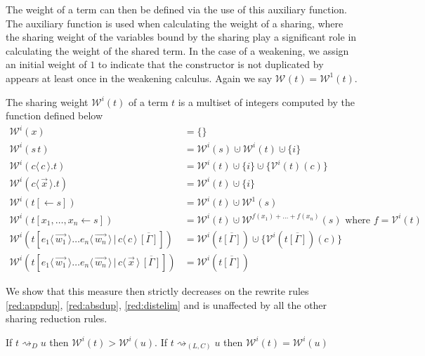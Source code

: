 \documentclass[a4paper,UKenglish,cleveref, autoref]{lipics-v2019}
\newcommand{\set}[1]{ \{ #1 \} }
\newcommand{\app}[2]{#1 \, #2}
\newcommand{\fake}[3]{#1 \langle \, #2 \, \rangle . #3}
\newcommand{\share}[3]{#1 [#2 \leftarrow #3]}
\newcommand{\dist}[5]{#1 [ #2 \, \vert \, \fakedist{#4}{#5} \, #3 ]}
\newcommand{\fakedist}[2]{#1 \langle \, #2 \, \rangle}
\newcommand{\weight}[2]{\mathcal{W}^{#1}(#2)}
\newcommand{\weightvar}[2]{\mathcal{V}^{#1}(#2)}
\begin{document}
\noindent The weight of a term can then be defined via the use of this auxiliary function. The auxiliary function is used when calculating the weight of a sharing, where the sharing weight of the variables bound by the sharing play a significant role in calculating the weight of the shared term. In the case of a weakening, we assign an initial weight of $1$ to indicate that the constructor is not duplicated by appears at least once in the weakening calculus. Again we say $\weight{}{t} = \weight{1}{t}$.

\begin{definition}
The sharing weight $\weight{i}{t}$ of a term $t$ is a multiset of integers computed by the function defined below
\begin{align*}
	\weight{i}{x} &= \set{} \\
	\weight{i}{\app{s}{t}} &= \weight{i}{s} \cupdot \weight{i}{t} \cupdot \set{i}\\
	\weight{i}{\fake{c}{c}{t}} &= \weight{i}{t} \cupdot \set{i} \cupdot \set{\weightvar{i}{t}(c)} \\
	\weight{i}{\fake{c}{\vec{x}}{t}} &= \weight{i}{t} \cupdot \set{i} \\
	\weight{i}{\share{t}{}{s}} &= \weight{i}{t} \cupdot \weight{1}{s} \\
	\weight{i}{\share{t}{x_{1}, \dots, x_{n}}{s}} &= \weight{i}{t} \cupdot \weight{f(x_{1}) + \dots + f(x_{n})}{s} \text{ where } f = \weightvar{i}{t} \\
	\weight{i}{\dist{t}{\fakedist{e_{1}}{\vec{w_{1}}} \dots \fakedist{e_{n}}{\vec{w_{n}}}}{\overline{[\Gamma]}}{c}{c}} &= \weight{i}{t\overline{[\Gamma]}} \cupdot \set{\weightvar{i}{t\overline{[\Gamma]}} (c)} \\ %
	\weight{i}{\dist{t}{\fakedist{e_{1}}{\vec{w_{1}}} \dots \fakedist{e_{n}}{\vec{w_{n}}}}{\overline{[\Gamma]}}{c}{\vec{x}}} &= \weight{i}{t\overline{[\Gamma]}}
\end{align*}
\end{definition}

\noindent We show that this measure then strictly decreases on the rewrite rules \ref{red:appdup}, \ref{red:absdup}, \ref{red:distelim} and is unaffected by all the other sharing reduction rules.

\begin{lemma}
\label{theo:decreaseweight}
If $t \rightsquigarrow_{D} u$ then $\weight{i}{t} > \weight{i}{u}$. If $t \rightsquigarrow_{(L, C)} u$ then $\weight{i}{t} = \weight{i}{u}$
\end{lemma}
\end{document}
